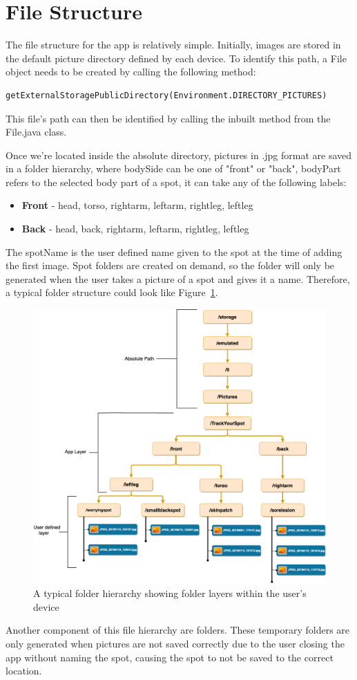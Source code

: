 \section{File Structure} \label{sec:filestructure}
The file structure for the app is relatively simple. Initially, images are stored in the default picture directory defined by each device. To identify this path, a File object needs to be created by calling the following method: \begin{verbatim}
getExternalStoragePublicDirectory(Environment.DIRECTORY_PICTURES)
\end{verbatim}
This file's path can then be identified by calling the inbuilt  method from the File.java class. 

\par Once we're located inside the absolute directory, pictures in .jpg format are saved in a 
folder hierarchy, where bodySide can be one of "front" or "back", bodyPart refers to the selected body part of a spot, it can take any of the following labels:
\begin{itemize}
    \item \textbf{Front} - head, torso, rightarm, leftarm, rightleg, leftleg
    \item \textbf{Back} - head, back, rightarm, leftarm, rightleg, leftleg
\end{itemize}
The spotName is the user defined name given to the spot at the time of adding the first image. Spot folders are created on demand, so the  folder will only be generated when the user takes a picture of a spot and gives it a name. Therefore, a typical folder structure could look like Figure~\ref{fig:filestructure.png}.
\begin{figure}
    \includegraphics[width=1.2\textwidth, center]{figures/filestructure.png}
    \caption{A typical folder hierarchy showing folder layers within the user's device}
    \label{fig:filestructure.png}
\end{figure}
\par Another component of this file hierarchy are  folders. These temporary folders are only generated when pictures are not saved correctly due to the user closing the app without naming the spot, causing the spot to not be saved to the correct location.